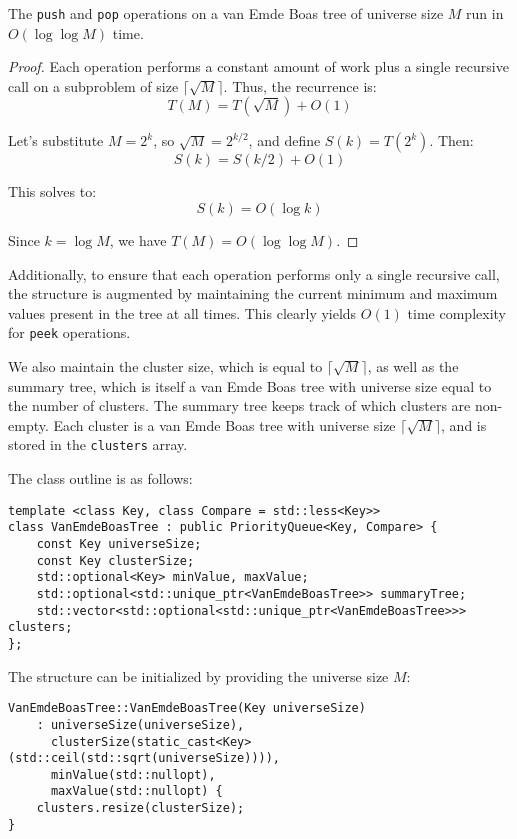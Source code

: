 \begin{lemma}
The \texttt{push} and \texttt{pop} operations on a van Emde Boas tree of universe size \( M \) run in \( O(\log \log M) \) time.
\end{lemma}

\begin{proof}
Each operation performs a constant amount of work plus a single recursive call on a subproblem of size \( \lceil \sqrt{M} \rceil \). Thus, the recurrence is:
\[T(M) = T(\sqrt{M}) + O(1)\]

Let's substitute \( M = 2^k \), so \( \sqrt{M} = 2^{k/2} \), and define \( S(k) = T(2^k) \). Then:
\[ S(k) = S(k/2) + O(1) \]

This solves to:
\[ S(k) = O(\log k) \]

Since \( k = \log M \), we have \( T(M) = O(\log \log M) \).
\end{proof}

Additionally, to ensure that each operation performs only a single recursive call, the structure is augmented by maintaining the current minimum and maximum values present in the tree at all times. This clearly yields \( O(1) \) time complexity for \texttt{peek} operations.

We also maintain the cluster size, which is equal to \( \lceil \sqrt{M} \rceil \), as well as the summary tree, which is itself a van Emde Boas tree with universe size equal to the number of clusters. The summary tree keeps track of which clusters are non-empty. Each cluster is a van Emde Boas tree with universe size \( \lceil \sqrt{M} \rceil \), and is stored in the \texttt{clusters} array.

The class outline is as follows:

\begin{verbatim}
template <class Key, class Compare = std::less<Key>>
class VanEmdeBoasTree : public PriorityQueue<Key, Compare> {
    const Key universeSize;
    const Key clusterSize;
    std::optional<Key> minValue, maxValue;
    std::optional<std::unique_ptr<VanEmdeBoasTree>> summaryTree;
    std::vector<std::optional<std::unique_ptr<VanEmdeBoasTree>>> clusters;
};
\end{verbatim}

The structure can be initialized by providing the universe size \( M \):

\begin{verbatim}
VanEmdeBoasTree::VanEmdeBoasTree(Key universeSize)
    : universeSize(universeSize), 
      clusterSize(static_cast<Key>(std::ceil(std::sqrt(universeSize)))),
      minValue(std::nullopt), 
      maxValue(std::nullopt) {
    clusters.resize(clusterSize);
}
\end{verbatim}

